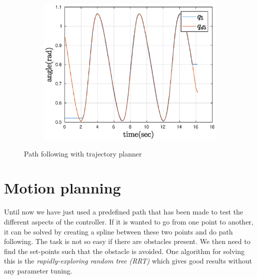\begin{figure}[htbp]
\begin{subfigure}[htbp]{0.45\textwidth}
        \includegraphics[width = \picsSiz\linewidth]{img/pathF5ff.eps}
        \caption{ }
    \end{subfigure}
    \caption{Path following with trajectory planner}
    \label{fig:pathTSff}
\end{figure}
\newpage

\section{Motion planning}
Until now we have just used a predefined path that has been made to test the different aspects of the controller. If it is wanted to go from one point to another, it can be solved by creating a spline between these two points and do path following\cite{Spline,MatlabSpline2,MatlabSpline}. The task is not so easy if there are obstacles present. We then need to find the set-points such that the obstacle is avoided. One algorithm for solving this is the \textit{rapidly-exploring random tree (RRT)} which gives good results without any parameter tuning\cite{Lavalle}. 

